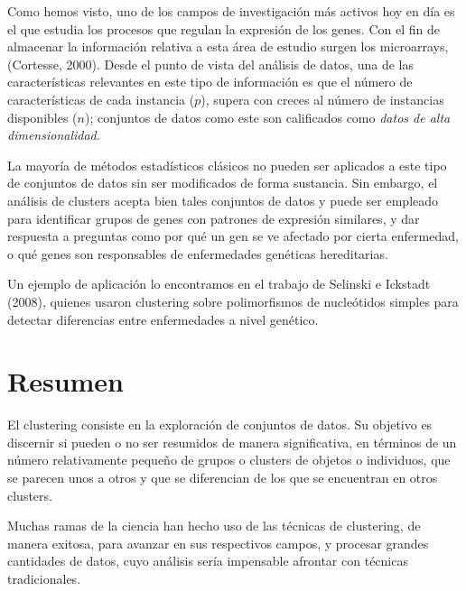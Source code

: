 Como hemos visto, uno de los campos de investigación más activos hoy en día es el que estudia los procesos que regulan la expresión de los genes. Con el fin de almacenar la información relativa a esta área de estudio surgen los microarrays, (Cortesse, 2000). Desde el punto de vista del análisis de datos, una de las características relevantes en este tipo de información es que el número de características de cada instancia ($p$), supera con creces al número de instancias disponibles ($n$); conjuntos de datos como este son calificados como \textit{datos de alta dimensionalidad}.

La mayoría de métodos estadísticos clásicos no pueden ser aplicados a este tipo de conjuntos de datos sin ser modificados de forma sustancia. Sin embargo, el análisis de clusters acepta bien tales conjuntos de datos y puede ser empleado para identificar grupos de genes con patrones de expresión similares, y dar respuesta a preguntas como por qué un gen se ve afectado por cierta enfermedad, o qué genes son responsables de enfermedades genéticas hereditarias.

Un ejemplo de aplicación lo encontramos en el trabajo de Selinski e Ickstadt (2008), quienes usaron clustering sobre polimorfismos de nucleótidos simples para detectar diferencias entre enfermedades a nivel genético.

\section{Resumen}

El clustering consiste en la exploración de conjuntos de datos. Su objetivo es discernir si pueden o no ser resumidos de manera significativa, en términos de un número relativamente pequeño de grupos o clusters de objetos o individuos, que se parecen unos a otros y que se diferencian de los que se encuentran en otros clusters.

Muchas ramas de la ciencia han hecho uso de las técnicas de clustering, de manera exitosa, para avanzar en sus respectivos campos, y procesar grandes cantidades de datos, cuyo análisis sería impensable afrontar con técnicas tradicionales.






















